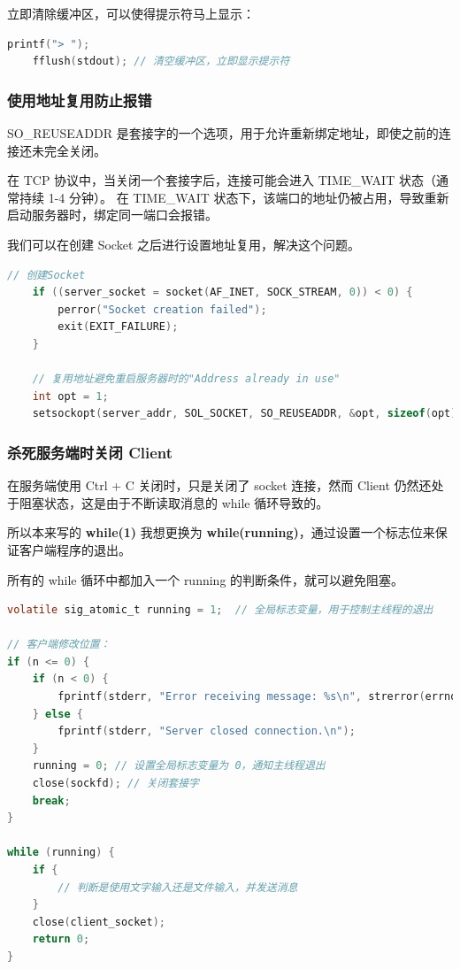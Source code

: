 \documentclass[14pt,a4paper,UTF8,twoside]{article}
\begin{document}
立即清除缓冲区，可以使得提示符马上显示：

\begin{lstlisting}[language=C, title={fflush}]
    printf("> ");
    fflush(stdout); // 清空缓冲区，立即显示提示符
\end{lstlisting}

\subsubsection{使用地址复用防止报错}

SO\_REUSEADDR 是套接字的一个选项，用于允许重新绑定地址，即使之前的连接还未完全关闭。

在 TCP 协议中，当关闭一个套接字后，连接可能会进入 TIME\_WAIT 状态（通常持续 1-4 分钟）。
在 TIME\_WAIT 状态下，该端口的地址仍被占用，导致重新启动服务器时，绑定同一端口会报错。

我们可以在创建 Socket 之后进行设置地址复用，解决这个问题。

\begin{lstlisting}[language=C, title={Address Reuse}]
    // 创建Socket
    if ((server_socket = socket(AF_INET, SOCK_STREAM, 0)) < 0) {
        perror("Socket creation failed");
        exit(EXIT_FAILURE);
    }

    // 复用地址避免重启服务器时的"Address already in use"
    int opt = 1;
    setsockopt(server_addr, SOL_SOCKET, SO_REUSEADDR, &opt, sizeof(opt));
\end{lstlisting}

\subsubsection{杀死服务端时关闭 Client}

在服务端使用 Ctrl + C 关闭时，只是关闭了 socket 连接，然而 Client 仍然还处于阻塞状态，这是由于不断读取消息的 while 循环导致的。

所以本来写的 \textbf{while(1)} 我想更换为 \textbf{while(running)}，通过设置一个标志位来保证客户端程序的退出。

所有的 while 循环中都加入一个 running 的判断条件，就可以避免阻塞。

\begin{lstlisting}[language = C, title={Kill Client}]
volatile sig_atomic_t running = 1;  // 全局标志变量，用于控制主线程的退出

// 客户端修改位置：
if (n <= 0) {
    if (n < 0) {
        fprintf(stderr, "Error receiving message: %s\n", strerror(errno));
    } else {
        fprintf(stderr, "Server closed connection.\n");
    }
    running = 0; // 设置全局标志变量为 0，通知主线程退出
    close(sockfd); // 关闭套接字
    break;
}

while (running) {
    if {
        // 判断是使用文字输入还是文件输入，并发送消息
    }
    close(client_socket);
    return 0;
}
\end{lstlisting}
\end{document}
